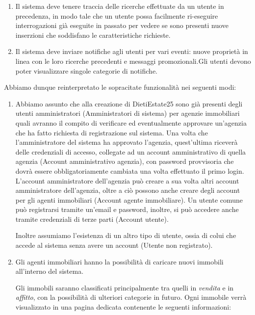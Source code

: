\documentclass{article}
\begin{document}
\begin{enumerate}
    \item Il sistema deve tenere traccia delle ricerche effettuate da un utente in precedenza, in modo tale che un utente possa facilmente ri-eseguire interrogazioni già eseguite in passato per vedere se sono presenti nuove inserzioni che soddisfano le caratteristiche richieste.

    \item Il sistema deve inviare notifiche agli utenti per vari eventi: nuove proprietà in linea con le loro ricerche precedenti e messaggi promozionali.Gli utenti devono poter visualizzare singole categorie di notifiche.
\end{enumerate}
\label{subsec:ElencoFunDev}
\newpage
Abbiamo dunque reinterpretato le sopracitate funzionalità nei seguenti modi:
\begin{enumerate}

    \item Abbiamo assunto che alla creazione di DietiEstate25 sono già presenti degli utenti amministratori ({\color{highlight}Amministratori di sistema}) per agenzie immobiliari quali avranno il compito di verificare ed eventualmente approvare un'agenzia che ha fatto richiesta di registrazione sul sistema.
          Una volta che l'amministratore del sistema ha approvato l'agenzia, quest'ultima riceverà delle credenziali di accesso, collegate ad un account amministrativo di quella agenzia ({\color{highlight}Account amministrativo agenzia}), con password provvisoria che dovrà essere obbligatoriamente cambiata una volta effettuato il primo login.
          L'account amministratore dell'agenzia può creare a sua volta altri account amministratore dell'agenzia, oltre a ciò possono anche creare degli account per gli agenti immobiliari ({\color{highlight}Account agente immobiliare}).
          Un utente comune può registrarsi tramite un'email e password, inoltre, si può accedere anche tramite credenziali di terze parti ({\color{highlight}Account utente}).
          \vspace{0.25cm}

          Inoltre assumiamo l’esistenza di un altro tipo di utente, ossia di colui che accede al sistema senza avere un account ({\color{highlight}Utente non registrato}).

    \item Gli agenti immobiliari hanno la possibilità di caricare nuovi {\color{highlight}immobili} all'interno del sistema.

          Gli immobili saranno classificati principalmente tra quelli in \emph{vendita} e in \emph{affitto}, con la possibilità di ulteriori categorie in futuro. Ogni immobile verrà visualizzato in una pagina dedicata contenente le seguenti informazioni:


\end{enumerate}
\end{document}
